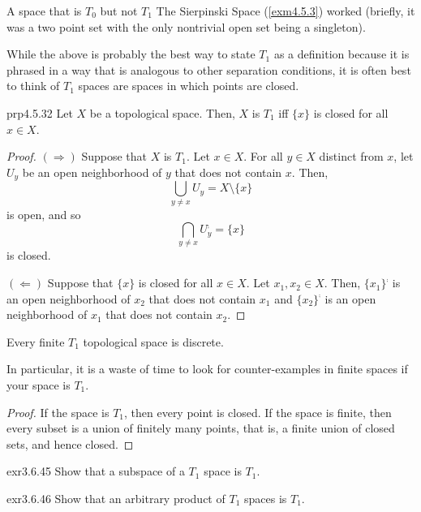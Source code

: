 \begin{exm}{A space that is $T_0$ but not $T_1$}{}
The Sierpinski Space (\cref{exm4.5.3}) worked (briefly, it was a two point set with the only nontrivial open set being a singleton).
\end{exm}
While the above is probably the best way to state $T_1$ as a definition because it is phrased in a way that is analogous to other separation conditions, it is often best to think of $T_1$ spaces are spaces in which points are closed.
\begin{prp}{}{prp4.5.32}
Let $X$ be a topological space.  Then, $X$ is $T_1$ iff $\{ x\}$ is closed for all $x\in X$.
\begin{proof}
$(\Rightarrow )$ Suppose that $X$ is $T_1$.  Let $x\in X$.  For all $y\in X$ distinct from $x$, let $U_y$ be an open neighborhood of $y$ that does not contain $x$.  Then,
\begin{equation}
\bigcup _{y\neq x}U_y=X\setminus \{ x\}
\end{equation}
is open, and so
\begin{equation}
\bigcap _{y\neq x}U_y^{\comp}=\{ x\}
\end{equation}
is closed.

\blankline
\noindent
$(\Leftarrow )$ Suppose that $\{ x\}$ is closed for all $x\in X$.  Let $x_1,x_2\in X$.  Then, $\{ x_1\} ^{\comp}$ is an open neighborhood of $x_2$ that does not contain $x_1$ and $\{ x_2\} ^{\comp}$ is an open neighborhood of $x_1$ that does not contain $x_2$.
\end{proof}
\end{prp}
\begin{crl}{}{}
Every finite $T_1$ topological space is discrete.
\begin{rmk}
In particular, it is a waste of time to look for counter-examples in finite spaces if your space is $T_1$.
\end{rmk}
\begin{proof}
If the space is $T_1$, then every point is closed.  If the space is finite, then every subset is a union of finitely many points, that is, a finite union of closed sets, and hence closed.
\end{proof}
\end{crl}
\begin{exr}{}{exr3.6.45}
Show that a subspace of a $T_1$ space is $T_1$.
\end{exr}
\begin{exr}{}{exr3.6.46}
Show that an arbitrary product of $T_1$ spaces is $T_1$.
\end{exr}
